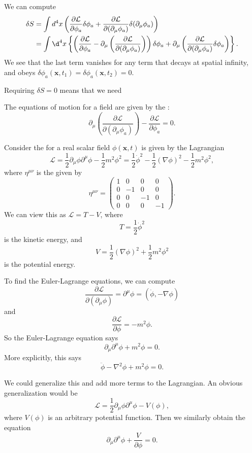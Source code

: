 \documentclass[a4paper]{article}
\begin{document}
We can compute
\begin{align*}
  \delta S &= \int d^4 x\left(\frac{\partial \mathcal{L}}{\partial \phi_a} \delta \phi_a + \frac{\partial \mathcal{L}}{\partial (\partial_\mu \phi_a)} \delta(\partial_\mu\phi_a)\right)\\
  &= \int \d^4 x \left\{\left(\frac{\partial \mathcal{L}}{\partial \phi_a} - \partial_\mu\left(\frac{\partial \mathcal{L}}{\partial (\partial_\mu\phi_a)}\right)\right) \delta \phi_a + \partial_\mu \left(\frac{\partial \mathcal{L}}{\partial (\partial_\mu\phi_a)} \delta\phi_a\right)\right\}.
\end{align*}
We see that the last term vanishes for any term that decays at spatial infinity, and obeys $\delta \phi_a(\mathbf{x}, t_1) = \delta\phi_a(\mathbf{x}, t_2) = 0$.

Requiring $\delta S = 0$ means that we need
\begin{prop}
  The equations of motion for a field are given by the :
  \[
    \partial_\mu\left(\frac{\partial \mathcal{L}}{\partial (\partial_\mu \phi_a)}\right) - \frac{\partial \mathcal{L}}{\partial \phi_a} = 0.
  \]
\end{prop}

\begin{eg}
  Consider the  for a real scalar field $\phi(\mathbf{x}, t)$ is given by the Lagrangian
  \[
    \mathcal{L} = \frac{1}{2} \partial_\mu \phi \partial^\mu \phi - \frac{1}{2}m^2 \phi^2 = \frac{1}{2} \dot{\phi}^2 - \frac{1}{2} (\nabla \phi)^2 - \frac{1}{2} m^2 \phi^2,
  \]
  where $\eta^{\mu\nu}$ is the  given by
  \[
    \eta^{\mu\nu} =
    \begin{pmatrix}
      1 & 0 & 0 & 0\\
      0 & -1 & 0 & 0\\
      0 & 0 & -1 & 0\\
      0 & 0 & 0 & -1
    \end{pmatrix}.
  \]
  We can view this as $\mathcal{L} = T - V$, where
  \[
    T = \frac{1}{2} \dot{\phi}^2
  \]
  is the kinetic energy, and
  \[
    V = \frac{1}{2} (\nabla \phi)^2 + \frac{1}{2}m^2 \phi^2
  \]
  is the potential energy.

  To find the Euler-Lagrange equations, we can compute
  \[
    \frac{\partial \mathcal{L}}{\partial(\partial_\mu \phi)} = \partial^\mu \phi = (\dot{\phi}, -\nabla \phi)
  \]
  and
  \[
    \frac{\partial \mathcal{L}}{\partial \phi} = -m^2 \phi.
  \]
  So the Euler-Lagrange equation says
  \[
    \partial_\mu \partial^\mu \phi + m^2 \phi = 0.
  \]
  More explicitly, this says
  \[
    \ddot{\phi} - \nabla^2 \phi + m^2 \phi = 0.
  \]
\end{eg}
We could generalize this and add more terms to the Lagrangian. An obvious generalization would be
\[
  \mathcal{L} = \frac{1}{2} \partial_\mu \phi \partial^\mu \phi - V(\phi),
\]
where $V(\phi)$ is an arbitrary potential function. Then we similarly obtain the equation
\[
  \partial_\mu \partial^\mu \phi + \frac{V}{\partial \phi} = 0.
\]
\end{document}
